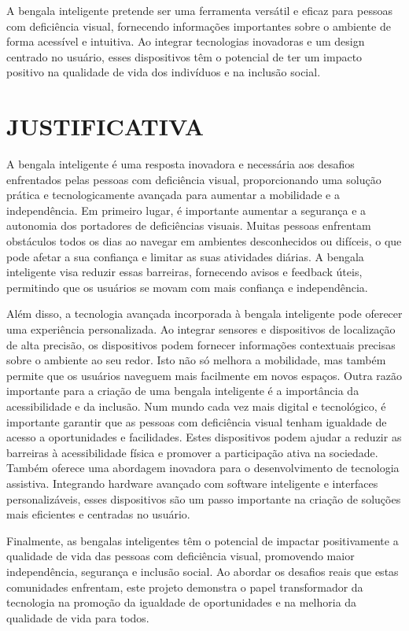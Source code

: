 A bengala inteligente pretende ser uma ferramenta versátil e eficaz para pessoas com deficiência visual, fornecendo informações importantes sobre o ambiente de forma acessível e intuitiva. Ao integrar tecnologias inovadoras e um design centrado no usuário, esses dispositivos têm o potencial de ter um impacto positivo na qualidade de vida dos indivíduos e na inclusão social.


\section{JUSTIFICATIVA}
A bengala inteligente é uma resposta inovadora e necessária aos desafios enfrentados pelas pessoas com deficiência visual, proporcionando uma solução prática e tecnologicamente avançada para aumentar a mobilidade e a independência. Em primeiro lugar, é importante aumentar a segurança e a autonomia dos portadores de deficiências visuais. Muitas pessoas enfrentam obstáculos todos os dias ao navegar em ambientes desconhecidos ou difíceis, o que pode afetar a sua confiança e limitar as suas atividades diárias. A bengala inteligente visa reduzir essas barreiras, fornecendo avisos e feedback úteis, permitindo que os usuários se movam com mais confiança e independência.

Além disso, a tecnologia avançada incorporada à bengala inteligente pode oferecer uma experiência personalizada. Ao integrar sensores e dispositivos de localização de alta precisão, os dispositivos podem fornecer informações contextuais precisas sobre o ambiente ao seu redor. Isto não só melhora a mobilidade, mas também permite que os usuários naveguem mais facilmente em novos espaços.
Outra razão importante para a criação de uma bengala inteligente é a importância da acessibilidade e da inclusão. Num mundo cada vez mais digital e tecnológico, é importante garantir que as pessoas com deficiência visual tenham igualdade de acesso a oportunidades e facilidades. Estes dispositivos podem ajudar a reduzir as barreiras à acessibilidade física e promover a participação ativa na sociedade. Também oferece uma abordagem inovadora para o desenvolvimento de tecnologia assistiva. Integrando hardware avançado com software inteligente e interfaces personalizáveis, esses dispositivos são um passo importante na criação de soluções mais eficientes e centradas no usuário.

Finalmente, as bengalas inteligentes têm o potencial de impactar positivamente a qualidade de vida das pessoas com deficiência visual, promovendo maior independência, segurança e inclusão social. Ao abordar os desafios reais que estas comunidades enfrentam, este projeto demonstra o papel transformador da tecnologia na promoção da igualdade de oportunidades e na melhoria da qualidade de vida para todos.


